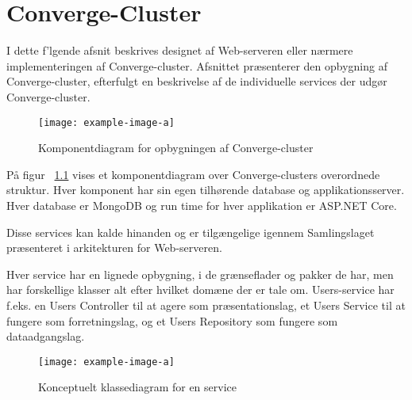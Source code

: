 \chapter{Converge-Cluster}

I dette f'lgende afsnit beskrives designet af Web-serveren eller nærmere implementeringen af Converge-cluster. Afsnittet præsenterer den opbygning af Converge-cluster, efterfulgt en beskrivelse af de individuelle services der udgør Converge-cluster. 



\begin{figure}
    \begin{small}
      \begin{center}
        \texttt{[image: example-image-a]}
      \end{center}
      \caption{Komponentdiagram for opbygningen af Converge-cluster}
      \label{fig:component-converge-cluster}
    \end{small}
  \end{figure}
  
  På figur ~\ref{fig:component-converge-cluster} vises et komponentdiagram over Converge-clusters overordnede struktur. Hver komponent har sin egen tilhørende database og applikationsserver. Hver database er MongoDB og run time for hver applikation er ASP.NET Core.
  
  Disse services kan kalde hinanden og er tilgængelige igennem Samlingslaget præsenteret i arkitekturen for Web-serveren.
  
  Hver service har en lignede opbygning, i de grænseflader og pakker de har, men har forskellige klasser alt efter hvilket domæne der er tale om. Users-service har f.eks. en Users Controller til at agere som præsentationslag, et Users Service til at fungere som forretningslag, og et Users Repository som fungere som dataadgangslag.


\begin{figure}
  \begin{small}
    \begin{center}
      \texttt{[image: example-image-a]}
    \end{center}
    \caption{Konceptuelt klassediagram for en service}
    \label{fig:conceptual-class-service}
  \end{small}
\end{figure}

